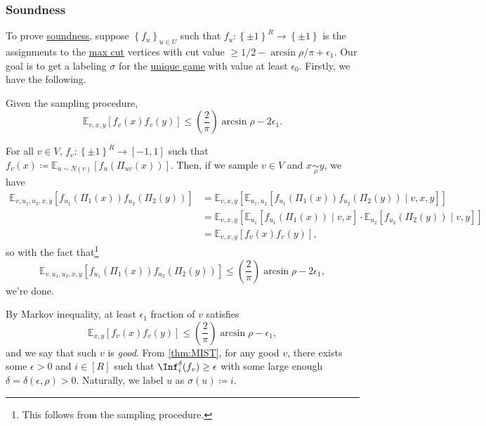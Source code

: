 \subsubsection{Soundness}
To prove \hyperref[def:soundness]{soundness}, suppose \(\left\{ f_u \right\} _{u\in U}\) such that \(f_u\colon \left\{ \pm 1 \right\} ^R \to \left\{ \pm 1 \right\} \) is the assignments to the \hyperref[prb:max-cut]{max cut} vertices with cut value \(\geq 1 / 2 - \arcsin \rho / \pi + \epsilon _1\). Our goal is to get a labeling \(\sigma \) for the \hyperref[prb:unique-game]{unique game} with value at least \(\epsilon _0\). Firstly, we have the following.

\begin{claim}
	Given the sampling procedure,
	\[
		\mathbb{E}_{v, x, y}\left[ f_v(x) f_v(y) \right]
		\leq \left( \frac{2}{\pi } \right) \arcsin \rho - 2\epsilon _1.
	\]
\end{claim}
\begin{explanation}
	For all \(v\in V\), \(f_v \colon \left\{ \pm 1 \right\} ^R \to [-1, 1]\) such that \(f_v(x) \coloneqq \mathbb{E}_{u \sim N(v)}\left[f_u (\Pi _{uv} (x) ) \right]\). Then, if we sample \(v\in V\) and \(x \underset{\rho }{\sim } y\), we have
	\[
		\begin{split}
			\mathbb{E}_{v, u_1, u_2, x, y}\left[f_{u_1}(\Pi _1(x)) f_{u_2}(\Pi _2(y)) \right]
			 & = \mathbb{E}_{v, x, y}\left[ \mathbb{E}_{u_1, u_2}\left[ f_{u_1}(\Pi _1(x)) f_{u_2}(\Pi _2(y)) \mid v, x, y\right] \right]                                       \\
			 & = \mathbb{E}_{v, x, y}\left[ \mathbb{E}_{u_1}\left[ f_{u_1}(\Pi _1(x)) \mid v, x\right] \cdot \mathbb{E}_{u_2}\left[f_{u_2}(\Pi _2(y)) \mid v, y \right] \right] \\
			 & = \mathbb{E}_{v, x, y}\left[ f_v(x) f_v(y) \right],
		\end{split}
	\]
	so with the fact that\footnote{This follows from the sampling procedure.}
	\[
		\mathbb{E}_{v, u_1, u_2, x, y}\left[f_{u_1}(\Pi _1(x)) f_{u_2}(\Pi _2(y)) \right]
		\leq \left( \frac{2}{\pi } \right) \arcsin \rho - 2\epsilon _1,
	\]
	we're done.
\end{explanation}

By Markov inequality, at least \(\epsilon _1\) fraction of \(v\) satisfies
\[
	\mathbb{E}_{x, y}\left[f_v(x) f_v(y) \right] \leq \left( \frac{2}{\pi } \right) \arcsin \rho - \epsilon _1,
\]
and we say that such \(v\) is \emph{good}. From \autoref{thm:MIST}, for any good \(v\), there exists some \(\epsilon > 0\) and \(i\in [R]\) such that \(\Inf_i^\delta (f_v)\geq \epsilon\) with some large enough \(\delta = \delta (\epsilon , \rho ) > 0\). Naturally, we label \(u\) as \(\sigma (u) \coloneqq i\).

